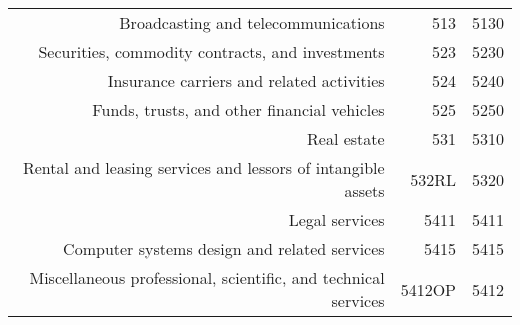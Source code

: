 \begin{landscape}
\begin{table}[h]
\begin{center}
\begin{tabular}{rrr}
Broadcasting and telecommunications                                  & 513         & 5130      \\%
Securities, commodity contracts, and investments                     & 523         & 5230      \\%
Insurance carriers and related activities                            & 524         & 5240      \\%
Funds, trusts, and other financial vehicles                          & 525         & 5250      \\%
Real estate                                                          & 531         & 5310      \\%
Rental and leasing services and lessors of intangible assets         & 532RL       & 5320      \\%
Legal services                                                       & 5411        & 5411      \\%
Computer systems design and related services                         & 5415        & 5415      \\%
Miscellaneous professional, scientific, and technical services       & 5412OP      & 5412      \\%

\end{tabular}
\end{center}
\end{table}
\end{landscape}
